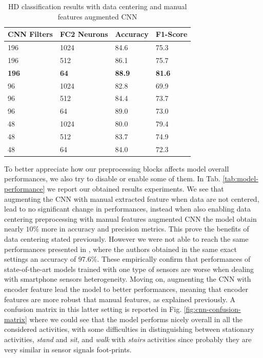 \begin{table}[h]
	\begin{center}
		\begin{tabular}{ p{1.8cm}p{1.9cm}p{1.7cm}p{1.7cm} }
			\hline
			CNN Filters & FC2 Neurons & Accuracy & F1-Score \\
			\hline
			196 & 1024 & 84.6 & 75.3 \\
			196 & 512 & 86.1 & 75.7 \\
			\textbf{196} & \textbf{64} & \textbf{88.9} & \textbf{81.6} \\
			96 & 1024 & 82.8 & 69.9 \\
			96 & 512 & 84.4 & 73.7 \\
			96 & 64 & 89.0 & 73.0 \\
			48 & 1024 & 80.0 & 79.4 \\
			48 & 512 & 83.7 & 74.9 \\
			48 & 64 & 84.0 & 72.3 \\
			\hline
		\end{tabular}
		\caption{\label{tab:model-selection} HD classification results with data centering and manual features augmented CNN}
	\end{center}
\end{table}


To better appreciate how our preprocessing blocks affects model overall performances, we also try to disable or enable some of them. In Tab. \ref{tab:model-performance} we report our obtained results experiments. We see that augmenting the CNN with manual extracted feature when data are not centered, lead to no significant change in performances, instead when also enabling data centering preprocessing with manual features augmented CNN the model obtain nearly $10\%$ more in accuracy and precision metrics. This prove the benefits of data centering stated previously. However we were not able to reach the same performances presented in \cite{ignatov2018real}, where the authors obtained in the same exact settings an accuracy of $97.6\%$. These empirically confirm that performances of state-of-the-art models trained with one type of sensors are worse when dealing with smartphone sensors heterogeneity. Moving on, augmenting the CNN with encoder feature lead the model to better performances, meaning that encoder features are more robust that manual features, as explained previously. A confusion matrix in this latter setting is reported in Fig. \ref{fig:cnn-confusion-matrix} where we could see that the model performs nicely overall in all the considered activities, with some difficulties in distinguishing between stationary activities, \textit{stand} and \textit{sit}, and \textit{walk} with \textit{stairs} activities since probably they are very similar in sensor signals foot-prints.

